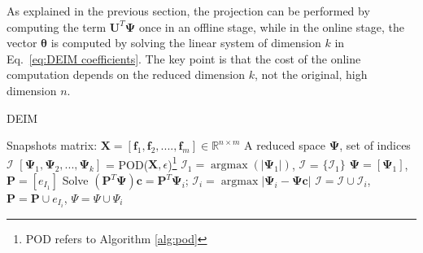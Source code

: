 \documentclass[]{interact}
\DeclareMathOperator{\argmaxH}{argmax}
\newcommand\abs[1]{\left|#1\right|}
\theoremstyle{plain}%
\theoremstyle{definition}
\theoremstyle{remark}
\begin{document}
As explained in the previous section, the projection can be performed by computing the term $\mathbf{U}^T \mathbf{\Psi}$ once in an offline stage, while in the online stage, the vector $\boldsymbol{\theta}$ is computed by solving the linear system of dimension $k$ in Eq.~\ref{eq:DEIM coefficients}.
The key point is that the cost of the online computation depends on the reduced dimension $k$, not the original, high dimension $n$.
\noindent\begin{minipage}{\textwidth}
	\renewcommand\footnoterule{}
	\begin{algorithm}[H]
		\caption{DEIM}
		\label{alg:DEIM}
		\begin{algorithmic}[1]
			\REQUIRE Snapshots matrix: $\mathbf{X} = [\mathbf{f}_1, \mathbf{f}_2,  ...., \mathbf{f}_m] \in \mathbb{R}^{n\times m}$
			\ENSURE A reduced space $\mathbf{\Psi}$, set of indices $\mathcal{I}$
			\STATE $[\mathbf{\Psi}_1, \mathbf{\Psi}_2, ..., \mathbf{\Psi}_k ]$ = POD(${\mathbf{X}}, \epsilon$)\footnote{POD refers to Algorithm \ref{alg:pod}}
			\STATE $\mathcal{I}_1 = \argmaxH(\abs{\mathbf{\Psi}_1})$, $\mathcal{I}$ = $\{\mathcal{I}_1\}$
			\STATE $\mathbf{\Psi} = [\mathbf{\Psi}_1]$, $\mathbf{P} =[e_{I_1}]$
			\STATE Solve $(\mathbf{P}^T\mathbf{\Psi})\mathbf{c} = \mathbf{P}^T\mathbf{\Psi}_i$;
			\STATE $\mathcal{I}_i = \argmaxH{\abs{\mathbf{\Psi}_i - \mathbf{\Psi}\mathbf{c}}}$
			\STATE $\mathcal{I} = \mathcal{I} \cup \mathcal{I}_i$, $\mathbf{P} = \mathbf{P} \cup e_{I_i}$, ${\Psi = \Psi \cup \Psi_i}$
			\ENDFOR
		\end{algorithmic}
	\end{algorithm}
\end{minipage}
\end{document}
